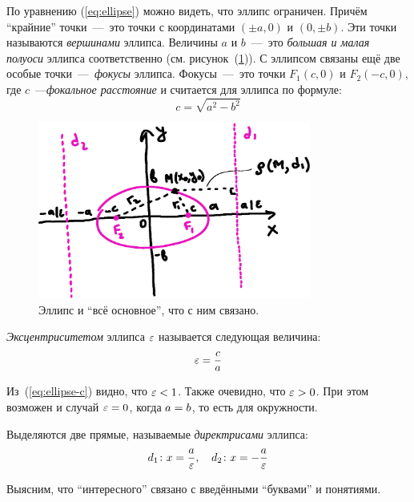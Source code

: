 \documentclass[a4paper,12pt]{article}
\begin{document}
  По уравнению (\ref{eq:ellipse}) можно видеть, что эллипс ограничен.
  Причём ``крайние'' точки~---~это точки с координатами $(\pm a, 0)$ и $(0, \pm b)$.
  Эти точки называются \emph{вершинами} эллипса.
  Величины $a$ и $b$~---~это \emph{большая и малая полуоси} эллипса соответственно (см. рисунок~(\ref{fig:ellipse})).
  С эллипсом связаны ещё две особые точки~---~\emph{фокусы} эллипса.
  Фокусы~---~это точки $F_1(c, 0)$ и $F_2(-c, 0)$, где $c$~---\emph{фокальное расстояние} и считается для эллипса по формуле:
  \begin{equation}\label{eq:ellipse-c}
    c = \sqrt{a^2 - b^2}
  \end{equation}
  
  \begin{figure}[h]
    \centering
    
    \includegraphics[width=0.8\textwidth]{ellipse}
    
    \caption{Эллипс и ``всё основное'', что с ним связано.}
    \label{fig:ellipse}
  \end{figure}
  
  \emph{Эксцентриситетом} эллипса $\varepsilon$ называется следующая величина:
  \begin{equation}
    \varepsilon = \frac{c}{a}
  \end{equation}
  
  Из~(\ref{eq:ellipse-c}) видно, что $\eps \hm< 1$.
  Также очевидно, что $\eps \hm> 0$.
  При этом возможен и случай $\eps \hm= 0$, когда $a \hm= b$, то есть для окружности.
  
  Выделяются две прямые, называемые \emph{директрисами} эллипса:
  \[
    d_1\colon x = \frac{a}{\varepsilon},\quad d_2\colon x = -\frac{a}{\varepsilon}
  \]
  
  \medskip
  
  Выясним, что ``интересного'' связано с введёнными ``буквами'' и понятиями.
  
\end{document}
